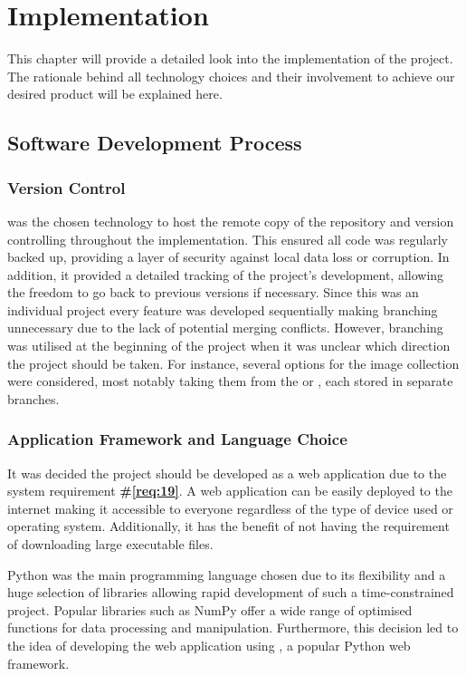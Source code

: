 \documentclass{l4proj}
\begin{document}
\chapter{Implementation}
This chapter will provide a detailed look into the implementation of the project. The rationale behind all technology choices and their involvement to achieve our desired product will be explained here. 

\section{Software Development Process}
\subsection{Version Control}
\cite{github} was the chosen technology to host the remote copy of the repository and version controlling throughout the implementation. This ensured all code was regularly backed up, providing a layer of security against local data loss or corruption. In addition, it provided a detailed tracking of the project's development, allowing the freedom to go back to previous versions if necessary. Since this was an individual project every feature was developed sequentially making branching unnecessary due to the lack of potential merging conflicts. However, branching was utilised at the beginning of the project when it was unclear which direction the project should be taken. For instance, several options for the image collection were considered, most notably taking them from the \cite{wikimedia_commons} or \cite{imagenet}, each stored in separate branches.


\subsection{Application Framework and Language Choice}
It was decided the project should be developed as a web application due to the system requirement \textbf{\#\ref{req:19}}. A web application can be easily deployed to the internet making it accessible to everyone regardless of the type of device used or operating system. Additionally, it has the benefit of not having the requirement of downloading large executable files.

Python \citep{python} was the main programming language chosen due to its flexibility and a huge selection of libraries allowing rapid development of such a time-constrained project. Popular libraries such as NumPy \citep{harris2020numpy} offer a wide range of optimised functions for data processing and manipulation. Furthermore, this decision led to the idea of developing the web application using \cite{django}, a popular Python web framework.
\end{document}
